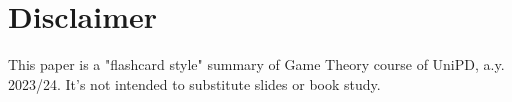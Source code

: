 \documentclass{article}
\begin{document}
\tableofcontents

\newpage
{} 

\section*{Disclaimer}
This paper is a "flashcard style" summary of Game Theory course of UniPD, a.y. 2023/24. It's not intended to substitute slides or book study.


\newpage

\newpage

\newpage

\newpage

\newpage

\newpage

\newpage

\newpage


\newpage

\newpage

\newpage

\newpage

\newpage

\newpage

\newpage

\newpage

\newpage

\newpage


\newpage




\end{document}
